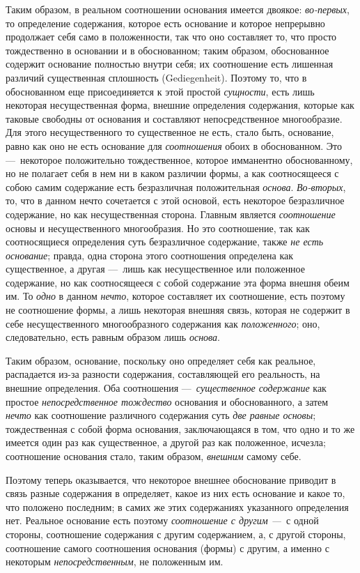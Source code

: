 Таким образом, в реальном соотношении основания имеется двоякое:
{\em во-первых}, то определение содержания, которое
есть основание и которое непрерывно продолжает себя само в положенности,
так что оно составляет то, что просто тождественно в основании и в
обоснованном; таким образом, обоснованное содержит основание полностью
внутри себя; их соотношение есть лишенная различий существенная сплошность
(Gediegenheit). Поэтому то, что в обоснованном еще присоединяется к этой
простой {\em сущности}, есть лишь некоторая
несущественная форма, внешние определения содержания, которые как таковые
свободны от основания и составляют непосредственное многообразие. Для этого
несущественного то существенное не есть, стало быть, основание, равно как
оно не есть основание для {\em соотношения} обоих в
обоснованном. Это —~некоторое положительно тождественное, которое
имманентно обоснованному, но не полагает себя в нем ни в каком различии
формы, а как соотносящееся с собою самим содержание есть безразличная
положительная {\em основа}.
{\em Во-вторых}, то, что в данном нечто сочетается с
этой основой, есть некоторое безразличное содержание, но как несущественная
сторона. Главным является {\em соотношение} основы и
несущественного многообразия. Но это соотношение, так как соотносящиеся
определения суть безразличное содержание, также {\em не
есть основание}; правда, одна сторона этого соотношения определена как
существенное, а другая —~лишь как несущественное или положенное содержание,
но как соотносящееся с собой содержание эта форма внешня обеим им. То
{\em одно} в данном {\em нечто},
которое составляет их соотношение, есть поэтому не соотношение формы, а
лишь некоторая внешняя связь, которая не содержит в себе несущественного
многообразного содержания как {\em положенного}; оно,
следовательно, есть равным образом лишь {\em основа}.

Таким образом, основание, поскольку оно определяет себя как реальное,
распадается из-за разности содержания, составляющей его реальность, на
внешние определения. Оба соотношения
—~{\em существенное содержание} как простое
{\em непосредственное тождество} основания и
обоснованного, а затем {\em нечто} как соотношение
различного содержания суть {\em две равные основы};
тождественная с собой форма основания, заключающаяся в том, что одно и то
же имеется один раз как существенное, а другой раз как положенное, исчезла;
соотношение основания стало, таким образом,
{\em внешним} самому себе.

Поэтому теперь оказывается, что некоторое внешнее обоснование приводит в
связь разные содержания в определяет, какое из них есть основание и какое
то, что положено последним; в самих же этих содержаниях указанного
определения нет. Реальное основание есть поэтому
{\em соотношение с другим —~}с одной стороны,
соотношение содержания с другим содержанием, а, с другой стороны,
соотношение самого соотношения основания (формы) с другим, а именно с
некоторым {\em непосредственным}, не положенным им.


